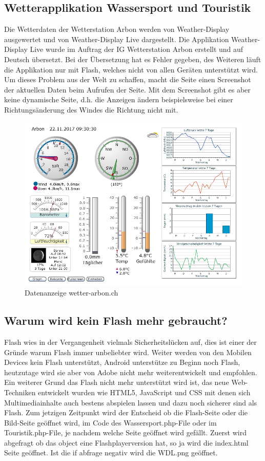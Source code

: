 \documentclass[a4paper,ngerman, 11pt, pagesize]{report}
\begin{document}
\subsection{Wetterapplikation Wassersport und Touristik}
Die Wetterdaten der Wetterstation Arbon werden von Weather-Display ausgewertet und von Weather-Display Live dargestellt. Die Applikation Weather-Display Live wurde im Auftrag der IG Wetterstation Arbon erstellt und auf Deutsch übersetzt. Bei der Übersetzung hat es Fehler gegeben, des Weiteren läuft die Applikation nur mit Flash, welches nicht von allen Geräten unterstützt wird. Um dieses Problem aus der Welt zu schaffen, macht die Seite einen Screenshot der aktuellen Daten beim Aufrufen der Seite. Mit dem Screenshot gibt es aber keine dynamische Seite, d.h. die Anzeigen ändern beispielsweise bei einer Richtungsänderung des Windes die Richtung nicht mit.  
\begin{figure}[htbp]
	\centering
	\includegraphics[width=0.9\linewidth]{img/grafik}
	\caption{Datenanzeige wetter-arbon.ch}
	\label{img:grafik-dummy}
\end{figure}

\subsection{Warum wird kein Flash mehr gebraucht?}
Flash wies in der Vergangenheit vielmals Sicherheitslücken auf, dies ist einer der Gründe warum Flash immer unbeliebter wird. Weiter werden von den Mobilen Devices kein Flash unterstützt, Android unterstütze zu Beginn noch Flash, heutzutage wird sie aber von Adobe nicht mehr weiterentwickelt und empfohlen. Ein weiterer Grund das Flash nicht mehr unterstützt wird ist, das neue Web-Techniken entwickelt wurden wie HTML5, JavaScript und CSS mit denen sich Multimediainhalte auch bestens abspielen lassen und dazu noch sicherer sind als Flash. Zum jetzigen Zeitpunkt wird der Entscheid ob die Flash-Seite oder die Bild-Seite geöffnet wird, im Code des Wassersport.php-File oder im Touristik.php-File, je nachdem welche Seite geöffnet wird gefällt. Zuerst wird abgefragt ob das object eine Flashplayerversion hat, so ja wird die index.html Seite geöffnet. Ist die if abfrage negativ wird die WDL.png geöffnet.
\end{document}
